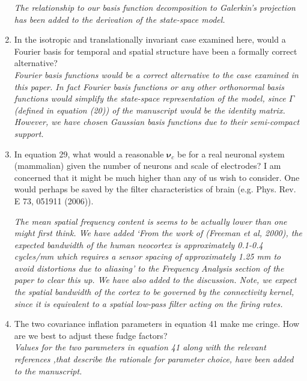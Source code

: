 \documentclass{article}
\begin{document}
\begin{enumerate}
\emph{The relationship to our basis function decomposition to Galerkin's projection has been added to the derivation of the state-space model. }

\item In the isotropic and translationally invariant case examined here, would a Fourier basis for temporal and spatial structure have been a formally correct alternative?\\

\emph{Fourier basis functions would be a correct alternative to the case examined in this paper. In fact Fourier basis functions or any other orthonormal basis functions would simplify the state-space representation of the model, since $\Gamma$ (defined in equation (20)) of the manuscript would be the identity matrix. However, we have chosen Gaussian basis functions due to their semi-compact support.} %

\item In equation 29, what would a reasonable $\boldsymbol{\nu}_c$ be for a real neuronal system (mammalian) given the number of neurons and scale of electrodes? I am concerned that it might be much higher than any of us wish to consider. One would perhaps be saved by the filter characteristics of brain (e.g. Phys. Rev. E 73, 051911 (2006)).

\emph{The mean spatial frequency content is seems to be actually lower than one might first think. We have added `From the work of (Freeman et al, 2000), the expected bandwidth of the human neocortex is approximately 0.1-0.4 cycles/mm which requires a sensor spacing of approximately 1.25 mm to avoid distortions due to aliasing' to the Frequency Analysis section of the paper to clear this up. We have also added to the discussion. Note, we expect the spatial bandwidth of the cortex to be governed by the connectivity kernel, since it is equivalent to a spatial low-pass filter acting on the firing rates.}

\item The two covariance inflation parameters in equation 41 make me cringe. How are we best to adjust these fudge factors?\\

\emph{Values for the two parameters in equation 41 along with the relevant references ,that describe the rationale for parameter choice, have been added to the manuscript.}


\end{enumerate}
\end{document}

